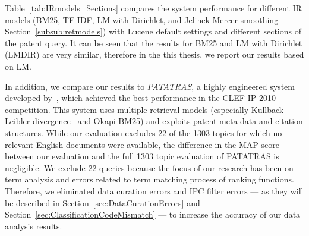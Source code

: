 Table~\ref{tab:IRmodels_Sections} compares the system performance for different IR models 
(BM25, TF-IDF, LM with Dirichlet, and Jelinek-Mercer smoothing --- Section~\ref{subsub:retmodels}) with Lucene default settings and different sections of the patent query.
It can be seen that the results for BM25 and LM with Dirichlet (LMDIR) are very similar, therefore in the this thesis, we report our results based on LM.    


In addition, we compare our results to \textit{PATATRAS}, a highly engineered system developed by~\cite{lopez2010experiments}, which achieved the best performance in the CLEF-IP 2010 competition. This system uses multiple retrieval models (especially Kullback-Leibler divergence~\citep{Baeza-Yates2011} and Okapi BM25) and exploits patent meta-data and citation structures. While our evaluation excludes 22 of the 1303 topics for which no relevant English documents were available, the difference in the MAP score between our evaluation and the full 1303 topic evaluation of PATATRAS is negligible. We exclude 22 queries because the focus of our research has been on term analysis and errors related to term matching process of ranking functions. Therefore, we eliminated data curation errors and IPC filter errors --- as they will be described in Section~\ref{sec:DataCurationErrors} and Section~\ref{sec:ClassificationCodeMismatch} --- to increase the accuracy of our data analysis results. 
% 

